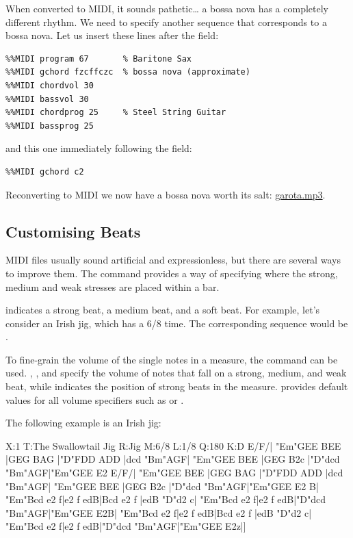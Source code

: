 \documentclass[a4paper,12pt]{book}
\begin{document}
When converted to MIDI, it sounds pathetic{\ldots} a bossa nova has a
completely different rhythm. We need to specify another 
sequence that corresponds to a bossa nova. Let us insert these lines
after the  field:

\begin{verbatim}
%%MIDI program 67       % Baritone Sax
%%MIDI gchord fzcffczc  % bossa nova (approximate)
%%MIDI chordvol 30
%%MIDI bassvol 30
%%MIDI chordprog 25     % Steel String Guitar
%%MIDI bassprog 25
\end{verbatim}

and this one immediately following the  field:

\begin{verbatim}
%%MIDI gchord c2
\end{verbatim}

Reconverting to MIDI we now have a bossa nova worth its salt:
\href{run:garota.mp3}{garota.mp3}.


\subsection{Customising Beats}

MIDI files usually sound artificial and expressionless, but there are
several ways to improve them. The command  provides a way of specifying where the strong, medium and
weak stresses are placed within a bar.

 indicates a strong beat,  a medium beat, and  a
soft beat. For example, let's consider an Irish jig, which has a 6/8
time. The corresponding  sequence would be .

To fine-grain the volume of the single notes in a measure, the
command can be used. , , and  specify
the volume of notes that fall on a strong, medium, and weak beat,
while  indicates the position of strong beats in the measure.
\abcmid{} provides default values for all volume specifiers such as
 or .

The following example is an Irish jig:

\begin{abcsource}
X:1
T:The Swallowtail Jig
R:Jig
M:6/8
L:1/8
Q:180
K:D
E/F/|
"Em"GEE BEE |GEG BAG |"D"FDD ADD    |dcd "Bm"AGF|
"Em"GEE BEE |GEG B2c |"D"dcd "Bm"AGF|"Em"GEE E2 E/F/|
"Em"GEE BEE |GEG BAG |"D"FDD ADD    |dcd "Bm"AGF|
"Em"GEE BEE |GEG B2c |"D"dcd "Bm"AGF|"Em"GEE E2 B|
"Em"Bcd e2 f|e2 f edB|Bcd e2 f      |edB "D"d2 c|
"Em"Bcd e2 f|e2 f edB|"D"dcd "Bm"AGF|"Em"GEE E2B|
"Em"Bcd e2 f|e2 f edB|Bcd e2 f      |edB "D"d2 c|
"Em"Bcd e2 f|e2 f edB|"D"dcd "Bm"AGF|"Em"GEE E2z|]
\end{abcsource}
\end{document}
